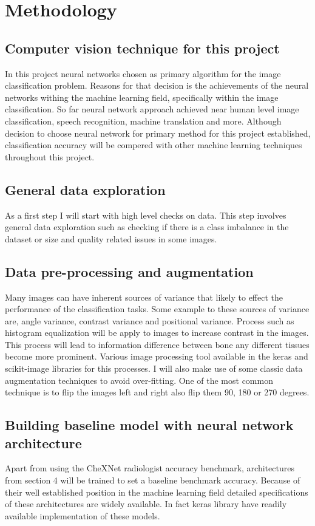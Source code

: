 \documentclass[12pt, twoside, a4paper]{article}
\begin{document}
\section{Methodology}

\subsection{Computer vision technique for this project}
In this project neural networks chosen as primary algorithm for the image classification problem. Reasons for that decision is the achievements of the neural networks withing the machine learning field, specifically within the image classification. So far neural network approach achieved near human level image classification, speech recognition, machine translation and more. Although decision to choose neural network for primary method for this project established, classification accuracy will be compered with other machine learning techniques throughout this project.


\subsection{General data exploration}
As a first step I will start with high level checks on data. This step involves general data exploration such as checking if there is a class imbalance in the dataset or size and quality related issues in some images.

\subsection{Data pre-processing and augmentation}
Many images can have inherent sources of variance that likely to effect the performance of the classification tasks. Some example to these sources of variance are, angle variance, contrast variance and positional variance. Process such as histogram equalization will be apply to images to increase contrast in the images. This process will lead to information difference between bone any different tissues become more prominent. Various image processing tool available in the keras \cite{keras} and scikit-image \cite{skimage} libraries for this processes. 
I will also make use of some classic data augmentation techniques to avoid over-fitting. One of the most common technique is to flip the images left and right also flip them 90, 180 or 270 degrees.

\subsection{Building baseline model with neural network architecture}
Apart from using the CheXNet \cite{CheXNetRP} radiologist accuracy benchmark, architectures from section 4 will be trained to set a baseline benchmark accuracy. Because of their well established position in the machine learning field detailed specifications of these architectures are widely available. In fact keras library \cite{keras} have readily available implementation of these models.
\end{document}
